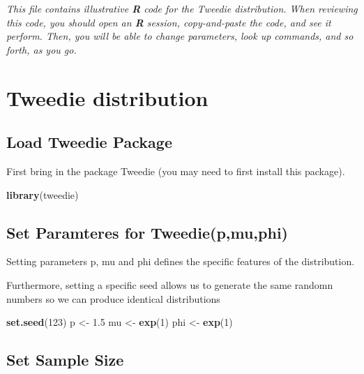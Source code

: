 \documentclass[]{book}
\newenvironment{Shaded}{\begin{snugshade}}{\end{snugshade}}
\newcommand{\KeywordTok}[1]{\textcolor[rgb]{0.13,0.29,0.53}{\textbf{#1}}}
\newcommand{\DecValTok}[1]{\textcolor[rgb]{0.00,0.00,0.81}{#1}}
\newcommand{\FloatTok}[1]{\textcolor[rgb]{0.00,0.00,0.81}{#1}}
\newcommand{\StringTok}[1]{\textcolor[rgb]{0.31,0.60,0.02}{#1}}
\newcommand{\NormalTok}[1]{#1}
\theoremstyle{definition}
\theoremstyle{definition}
\theoremstyle{definition}
\theoremstyle{remark}
\begin{document}
\emph{This file contains illustrative \textbf{R} code for the Tweedie
distribution. When reviewing this code, you should open an \textbf{R}
session, copy-and-paste the code, and see it perform. Then, you will be
able to change parameters, look up commands, and so forth, as you go. }

\section{Tweedie distribution}\label{tweedie-distribution}

\subsection{Load Tweedie Package}\label{load-tweedie-package}

First bring in the package Tweedie (you may need to first install this
package).

\begin{Shaded}
\begin{Highlighting}[]
\KeywordTok{library}\NormalTok{(tweedie)}
\end{Highlighting}
\end{Shaded}

\subsection{Set Paramteres for
Tweedie(p,mu,phi)}\label{set-paramteres-for-tweediepmuphi}

Setting parameters p, mu and phi defines the specific features of the
distribution.

Furthermore, setting a specific seed allows us to generate the same
randomn numbers so we can produce identical distributions

\begin{Shaded}
\begin{Highlighting}[]
\KeywordTok{set.seed}\NormalTok{(}\DecValTok{123}\NormalTok{)}
\NormalTok{p <-}\StringTok{ }\FloatTok{1.5}
\NormalTok{mu <-}\StringTok{ }\KeywordTok{exp}\NormalTok{(}\DecValTok{1}\NormalTok{) }
\NormalTok{phi <-}\StringTok{ }\KeywordTok{exp}\NormalTok{(}\DecValTok{1}\NormalTok{)}
\end{Highlighting}
\end{Shaded}

\subsection{Set Sample Size}\label{set-sample-size}
\end{document}
